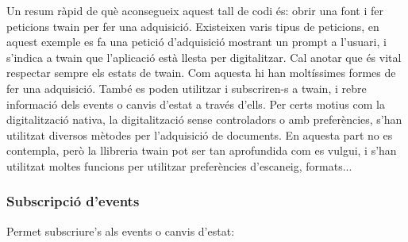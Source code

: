 \documentclass[letterpaper,11pt,catalan]{sphinxmanual}
\begin{document}
\begin{sphinxVerbatim}[commandchars=\\\{\}]
\PYG{p}{[}\PYG{p}{]}
 
  

 
       
 
  

    
\end{sphinxVerbatim}

Un resum ràpid de què aconsegueix aquest tall de codi és: obrir una font i fer peticions
twain per fer una adquisició. Existeixen varis tipus de peticions, en aquest exemple es
fa una petició d'adquisició mostrant un prompt a l'usuari, i s'indica a twain que l'aplicació
està llesta per digitalitzar. Cal anotar que és vital respectar sempre els estats de twain.
Com aquesta hi han moltíssimes formes de fer una adquisició. També es poden utilitzar 
i subscriren-s a twain, i rebre informació dels events o canvis d'estat a través d'ells.
Per certs motius com la digitalització nativa, la digitalització sense controladors o amb preferències,
s'han utilitzat diversos mètodes per l'adquisició de documents. En aquesta part no es contempla,
però la llibreria twain pot ser tan aprofundida com es vulgui, i s'han utilitzat moltes
funcions per utilitzar preferències d'escaneig, formats...


\subsubsection{Subscripció d'events}
\label{\detokenize{index:subscripcio-d-events}}
Permet subscriure's als events o canvis d'estat:
\end{document}

